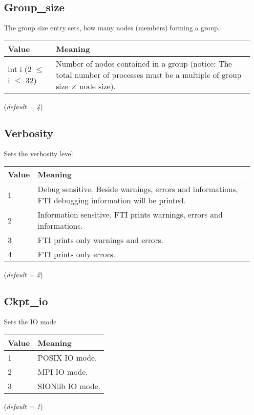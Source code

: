 \documentclass{refrep}
\begin{document}
\subsection{Group\_size}\label{subsec:groupsize}
The group size entry sets, how many nodes (members) forming a group.
\begin{center}
\begin{tabular}[h!]{|p{}|p{}|}
\hline
\textbf{Value} & \textbf{Meaning} \\ \hline
int i (2 $\leq$ i $\leq$ 32) & Number of nodes contained in a group (notice: The total number of processes must be a multiple of group size $\times$ node size). \\ \hline
\end{tabular}
\end{center}
(\textit{default = 4})
\subsection{Verbosity}\label{subsec:verbosity}
Sets the verbosity level
\begin{center}
\begin{tabular}[h!]{|p{}|p{}|}
\hline
\textbf{Value} & \textbf{Meaning} \\ \hline
1 & Debug sensitive. Beside warnings, errors and informations, FTI debugging information will be printed.  \\ \hline
2 & Information sensitive. FTI prints warnings, errors and informations. \\ \hline
3 & FTI prints only warnings and errors.  \\ \hline
4 & FTI prints only errors.  \\ \hline
\end{tabular}
\end{center}
(\textit{default = 2})
\subsection{Ckpt\_io}\label{subsec:ckptio}
Sets the IO mode
\begin{center}
\begin{tabular}[h!]{|p{}|p{}|}
\hline
\textbf{Value} & \textbf{Meaning} \\ \hline
1 & POSIX IO mode.  \\ \hline
2 & MPI IO mode. \\ \hline
3 & SIONlib IO mode.  \\ \hline
\end{tabular}
\end{center}
(\textit{default = 1})
\end{document}
